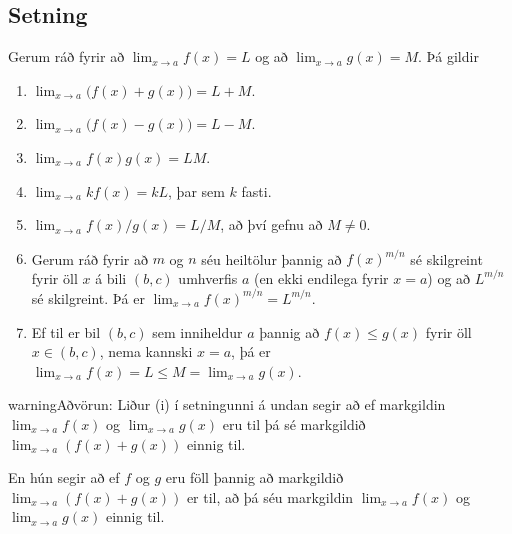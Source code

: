 \documentclass[a4paper,10pt,icelandic]{sphinxmanual}
\begin{document}
\subsection{Setning}
\label{\detokenize{kafli02:setning-markgildi}}\label{\detokenize{kafli02:id3}}
Gerum ráð fyrir að \(\lim_{x\rightarrow a}f(x)=L\) og að
\(\lim_{x\rightarrow a}g(x)=M\). Þá gildir
\begin{enumerate}
\item {} 
\(\lim_{x\rightarrow a}\Big(f(x)+g(x)\Big)=L+M\).

\item {} 
\(\lim_{x\rightarrow a}\Big(f(x)-g(x)\Big)=L-M\).

\item {} 
\(\lim_{x\rightarrow a}f(x)g(x)=LM\).

\item {} 
\(\lim_{x\rightarrow a}kf(x)=kL\), þar sem \(k\) fasti.

\item {} 
\(\lim_{x\rightarrow a}f(x)/g(x)=L/M\), að því gefnu að
\(M\neq 0\).

\item {} 
Gerum ráð fyrir að \(m\) og \(n\) séu heiltölur þannig að
\(f(x)^{m/n}\) sé skilgreint fyrir öll \(x\) á bili
\((b,c)\) umhverfis \(a\) (en ekki endilega fyrir
\(x=a\)) og að \(L^{m/n}\) sé skilgreint. Þá er
\(\lim_{x\rightarrow a}f(x)^{m/n}=L^{m/n}\).

\item {} 
Ef til er bil \((b,c)\) sem inniheldur \(a\) þannig að
\(f(x)\leq g(x)\) fyrir öll \(x\in (b,c)\), nema kannski
\(x=a\), þá er
\(\lim_{x\rightarrow a}f(x)=L\leq M=\lim_{x\rightarrow a}g(x)\).

\end{enumerate}

\begin{sphinxadmonition}{warning}{Aðvörun:}
Liður (i) í setningunni á undan segir að ef markgildin
\(\lim_{x\to a} f(x)\) og \(\lim_{x\to a} g(x)\) eru til þá sé
markgildið \(\lim_{x\to a} (f(x)+g(x))\) einnig til.

En hún segir  að ef \(f\) og \(g\) eru föll þannig að
markgildið \(\lim_{x\to a} (f(x)+g(x))\) er til, að þá séu
markgildin \(\lim_{x\to a} f(x)\) og \(\lim_{x\to a} g(x)\)
einnig til.
\end{sphinxadmonition}

\end{document}
